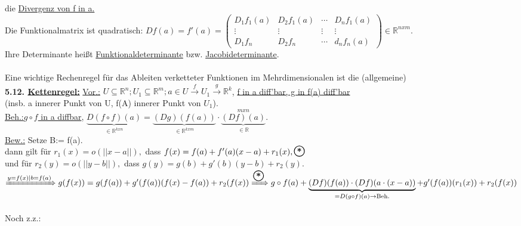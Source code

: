 \documentclass[]{scrartcl}
\newcommand{\blackcircle}[1]{%
	\tikz[baseline=(char.base)]{
		\node[shape=circle, draw=black, text=black, thick, inner sep=1pt] (char) 
		{\textbf{#1}};
	}%
}
\begin{document}
	die \ul{Divergenz von f in a.}\\
	Die Funktionalmatrix ist quadratisch: $Df(a)=f'(a)=\begin{pmatrix}
		D_1f_1(a)&D_2f_1(a)&\cdots&D_nf_1(a)\\
		\vdots&\vdots&\vdots&\vdots\\
		D_1f_n&D_2f_n&\cdots&d_nf_n(a)
	\end{pmatrix}\in \mathbb{R}^{n x m}.$\\
	Ihre Determinante heißt \ul{Funktionaldeterminante} bzw. \ul{Jacobideterminante}.\\
	\\
	Eine wichtige Rechenregel für das Ableiten verketteter Funktionen im Mehrdimensionalen ist die (allgemeine)\\
	\textbf{5.12. \ul{Kettenregel:}} \underline{Vor.:} $ U \subseteq\mathbb{R}^n; U_1\subseteq\mathbb{R}^m; a\in U\xrightarrow{f} U_1\xrightarrow{g}\mathbb{R}^k$, \ul{f in a diff'bar, g in f(a) diff'bar}\\
	(insb. a innerer Punkt von U, f(A) innerer Punkt von $U_1$).\\
	\underline{Beh.:}\ul{$g\circ f$ in a diffbar},  $\underbrace{D(f\circ f) (a)}_{\in\mathbb{R}^{k x n}}=\underbrace{(Dg)(f(a))}_{\in\mathbb{R}^{k x m}}\cdot \underbrace{(Df)(a)}_{\in\mathbb{R}}^{m x n}$.\\
	\underline{Bew.:} Setze B:= f(a).\\
	dann gilt für $r_1(x)=o(||x-a||),$ dass $ f(x)=f(a)+f'(a)(x-a)+r_1(x), \blackcircle{*}$\\
	und für $r_2(y)=o(||y-b||),$ dass $ g(y)=g(b)+g'(b)(y-b)+r_2(y).$\\
	$\xRightarrow{y=f(x)|b=f(a)} g(f(x))=g(f(a))+g'(f(a))(f(x)-f(a))+r_2(f(x))\\
	\xRightarrow{\blackcircle{*}}g \circ f (a)+\underbrace{(Df)(f(a))\cdot (Df)(a\cdot(x-a))}_{=D(g\circ f)(a)\rightarrow\text{Beh.}}+g'(f(a))(r_1(x))+r_2(f(x))$\\
	\\
	Noch z.z.:
	
	
	
	
	
	
\end{document}
